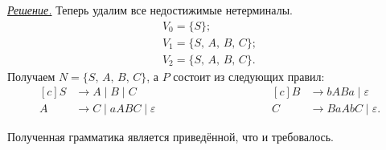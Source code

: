 \documentclass[10pt]{article}
\newcounter{pr} \setcounter{pr}{0}
\newenvironment{sol}
  {\par
   {\itshape \underline{Решение.}}}
  {}
\newcommand{\eps}{\varepsilon}
\begin{document}
\begin{pr}
\begin{sol}
      Теперь удалим все недостижимые нетерминалы.
      \begin{gather*}
        V_0 = \{ S \}; \\
        V_1 = \{ S,\, A,\, B,\, C \}; \\
        V_2 = \{ S,\, A,\, B,\, C \}.
      \end{gather*}
      Получаем $N = \{ S,\, A,\, B,\, C \}$, а $P$ состоит из следующих правил:
      \begin{equation*}
        \begin{aligned}[c]
          S & \to A \mid B \mid C \\
          A & \to C  \mid aABC \mid \eps
        \end{aligned}
        \hspace{4cm}
        \begin{aligned}[c]
          B & \to bABa \mid \eps \\
          C & \to BaAbC \mid \eps.
        \end{aligned}
      \end{equation*}

      Полученная грамматика является приведённой, что и требовалось.
    \end{sol}
  \end{pr}
\end{document}
